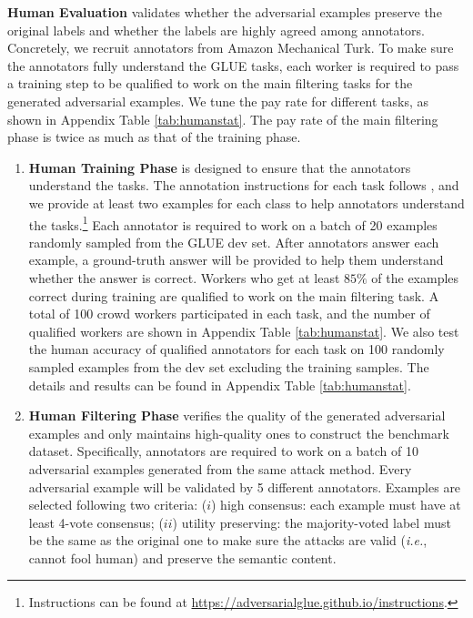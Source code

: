 \documentclass{article}
\begin{document}
\textbf{Human Evaluation} validates whether the adversarial examples preserve the original labels and whether the labels are highly agreed among annotators. Concretely, we recruit annotators from Amazon Mechanical Turk. To make sure the annotators fully understand the GLUE tasks, each worker is required to pass  a training step to be qualified to work on the main filtering tasks for the generated adversarial examples. We tune the pay rate for different tasks, as shown in Appendix Table \ref{tab:humanstat}. The pay rate of the main filtering phase is twice as much as that of the training phase.
\begin{enumerate}[leftmargin=*]
\item \textbf{Human Training Phase} is designed to ensure that the annotators understand the tasks. The annotation instructions for each task follows \citep{muppet}, and we provide at least two examples for each class to help annotators understand the tasks.\footnote{Instructions can be found at \url{https://adversarialglue.github.io/instructions}.} Each annotator is required to work on a batch of 20 examples randomly sampled from the GLUE dev set. After  annotators answer each example, a ground-truth answer will be provided to help them understand whether the answer is correct. Workers who get at least $85\%$ of the examples correct during training are qualified to work on the main filtering task. A total of 100 crowd workers participated in each task, and the number of qualified workers are shown in Appendix Table \ref{tab:humanstat}. We also test the human accuracy of qualified annotators for each task on 100 randomly sampled examples from the dev set excluding the training samples. The details and results can be found in Appendix Table \ref{tab:humanstat}.
\item \textbf{Human Filtering Phase} verifies the quality of the generated adversarial examples and only maintains high-quality ones to construct the benchmark dataset. Specifically, annotators are required to work on a batch of 10 adversarial examples generated from the same attack method. Every adversarial example will be validated by 5 different annotators.
Examples are selected following two criteria: ($i$) high consensus: each example must have at least 4-vote consensus; ($ii$) utility preserving: the majority-voted label must be the same as the original one to make sure the attacks are valid (\emph{i.e.}, cannot fool human) and preserve the semantic content. 
\end{enumerate}
\end{document}
